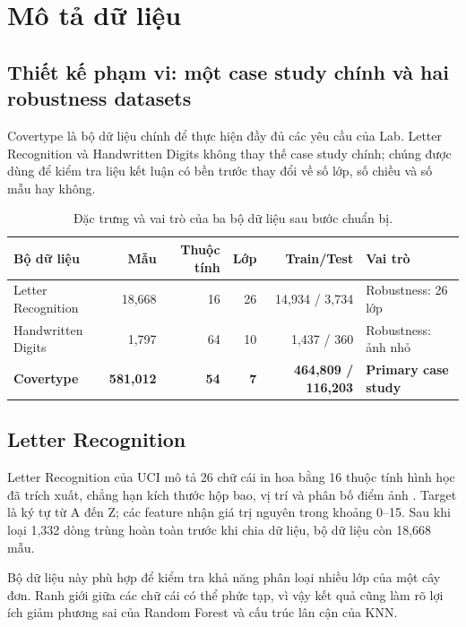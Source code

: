 \chapter{Mô tả dữ liệu}

\section{Thiết kế phạm vi: một case study chính và hai robustness datasets}

Covertype là bộ dữ liệu chính để thực hiện đầy đủ các yêu cầu của Lab. Letter Recognition và Handwritten Digits không thay thế case study chính; chúng được dùng để kiểm tra liệu kết luận có bền trước thay đổi về số lớp, số chiều và số mẫu hay không.

\begin{table}[H]
    \centering
    \small
    \caption[Đặc trưng của ba bộ dữ liệu]{Đặc trưng và vai trò của ba bộ dữ liệu sau bước chuẩn bị.}
    \label{tab:dataset-summary}
    \begin{tabularx}{\textwidth}{@{}>{\raggedright\arraybackslash}Xrrrr>{\raggedright\arraybackslash}X@{}}
        \toprule
        \textbf{Bộ dữ liệu} & \textbf{Mẫu} & \textbf{Thuộc tính} & \textbf{Lớp} & \textbf{Train/Test} & \textbf{Vai trò} \\
        \midrule
        Letter Recognition & 18,668 & 16 & 26 & 14,934 / 3,734 & Robustness: 26 lớp \\
        Handwritten Digits & 1,797 & 64 & 10 & 1,437 / 360 & Robustness: ảnh nhỏ \\
        \textbf{Covertype} & \textbf{581,012} & \textbf{54} & \textbf{7} & \textbf{464,809 / 116,203} & \textbf{Primary case study} \\
        \bottomrule
    \end{tabularx}
\end{table}

\section{Letter Recognition}

Letter Recognition của UCI mô tả 26 chữ cái in hoa bằng 16 thuộc tính hình học đã trích xuất, chẳng hạn kích thước hộp bao, vị trí và phân bố điểm ảnh \cite{slate1991letter}. Target là ký tự từ A đến Z; các feature nhận giá trị nguyên trong khoảng 0--15. Sau khi loại 1,332 dòng trùng hoàn toàn trước khi chia dữ liệu, bộ dữ liệu còn 18,668 mẫu.

Bộ dữ liệu này phù hợp để kiểm tra khả năng phân loại nhiều lớp của một cây đơn. Ranh giới giữa các chữ cái có thể phức tạp, vì vậy kết quả cũng làm rõ lợi ích giảm phương sai của Random Forest và cấu trúc lân cận của KNN.

